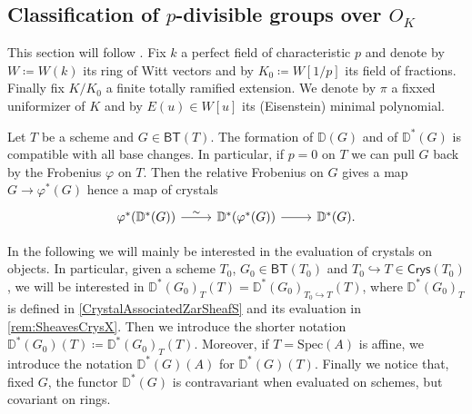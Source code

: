 


\subsection{Classification of \texorpdfstring{$p$}{p}-divisible groups
	over \texorpdfstring{$O_{ K }$}{the ring of integers of K}}
This section will follow \cite[Appendix A]{Kisin}.
Fix $k$ a perfect field of characteristic $p$ and denote by
$W \coloneqq W(k)$ its ring of Witt vectors and by $K_0 \coloneqq W[1/p]$
its field of fractions.
Finally fix $K/K_0$ a finite totally ramified extension.
We denote by $\pi$ a fixxed uniformizer of $K$ and by $E(u) \in W[u]$
its (Eisenstein) minimal polynomial.


\begin{rem}[]
	Let $T$ be a scheme and $G \in \mathsf{BT}(T)$.
	The formation of $\mathbb{D}(G)$ and of $\mathbb{D}^*(G)$ is compatible
	with all base changes. %
	In particular, if $p = 0$ on $T$ we can pull $G$ back by the Frobenius $\varphi$ on $T$.
	Then the relative Frobenius on $G$ gives a map $G \to \varphi^*(G)$
	hence a map of crystals
	\begin{equation*}
	\begin{tikzcd}
		\varphi^* (\mathbb{D}^*(G)) \arrow[r, "\sim", rightarrow] &
		\mathbb{D}^*(\varphi^*(G)) \arrow[r, "", rightarrow] &
		\mathbb{D}^*(G)
	.\end{tikzcd}
	\end{equation*}
\end{rem}


\begin{ntt}[]
	In the following we will mainly be interested in the evaluation of
	crystals on objects.
	In particular, given a scheme $T_0$, $G_0 \in \mathsf{BT}(T_0)$ and 
	$T_0 \hookrightarrow T \in \mathsf{Crys}(T_0)$, we will be interested
	in $\mathbb{D}^*(G_0)_{T}(T) = \mathbb{D}^*(G_0)_{T_0 \hookrightarrow T}(T)$,
	where $\mathbb{D}^*(G_0)_T$ is defined in \cref{CrystalAssociatedZarSheafS}
	and its evaluation in \cref{rem:SheavesCrysX}.
	Then we introduce the shorter notation
	$\mathbb{D}^*(G_0)(T) \coloneqq \mathbb{D}^*(G_0)_T(T)$.
	Moreover, if $T = \mathrm{Spec}(A)$ is affine, we introduce the notation
	$\mathbb{D}^*(G)(A)$ for $\mathbb{D}^*(G)(T)$.
	Finally we notice that, fixed $G$, the functor $\mathbb{D}^*(G)$
	is contravariant when evaluated on schemes, but covariant on rings.
\end{ntt}


